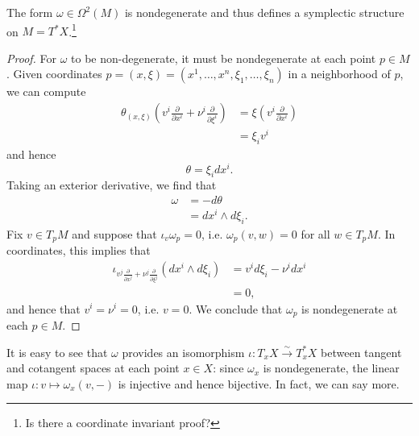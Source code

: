 \documentclass{amsart}
\begin{document}
\begin{proposition}
    The form $\omega\in\Omega^2(M)$ is nondegenerate and thus defines a symplectic structure on
    $M=T^*X$.\footnote{Is there a coordinate invariant proof?}
\end{proposition}
\begin{proof}
    For $\omega$ to be non-degenerate, it must be nondegenerate at each point $p\in M$. Given
    coordinates $p=(x,\xi)=(x^1,\ldots,x^n,\xi_1,\ldots,\xi_n)$ in a neighborhood of $p$, we can
    compute
    \begin{align*}
        \theta_{(x,\xi)}\left( v^i\frac{\partial}{\partial x^i} + \nu^i\frac{\partial}{\partial\xi^i} \right)
        &= \xi\left( v^i\frac{\partial}{\partial x^i} \right) \\
        &= \xi_iv^i
    \end{align*}
    and hence
    \begin{equation*}
        \theta = \xi_i dx^i.
    \end{equation*}
    Taking an exterior derivative, we find that
    \begin{align*}
        \omega &= - d\theta \\
        &= dx^i\wedge d\xi_i.
    \end{align*}
    Fix $v\in T_pM$ and suppose that $\iota_v\omega_p=0$, i.e. $\omega_p(v,w)=0$
    for all $w\in T_pM$. In coordinates, this implies that
    \begin{align*}
        \iota_{v^j\frac{\partial}{\partial x^j}+\nu^j\frac{\partial}{\partial\xi^j}}(dx^i\wedge d\xi_i)
        &= v^id\xi_i-\nu^idx^i\\
        &=0,
    \end{align*}
    and hence that $v^i=\nu^i=0$, i.e. $v=0$. We conclude that $\omega_p$ is nondegenerate at each $p\in M$.
\end{proof}




It is easy to see that $\omega$ provides an isomorphism $\iota:T_xX\xrightarrow{\sim} T_x^*X$
between tangent and cotangent spaces at each point $x\in X$: since $\omega_x$ is nondegenerate, the linear
map $\iota:v\mapsto \omega_x(v,-)$ is injective and hence bijective. In fact, we can say more.
\end{document}
